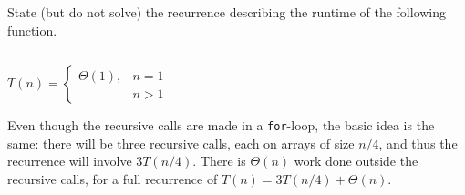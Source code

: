 \begin{prob}
    State (but do not solve) the recurrence describing the runtime of the following function.

    \inputminted{python}{code.py}

    $
        T(n) = \begin{cases}
            \Theta(1), & n = 1\\
             & n > 1
        \end{cases}
    $
    

    \begin{soln}
        Even though the recursive calls are made in a \texttt{for}-loop, the
        basic idea is the same: there will be three recursive calls, each on
        arrays of size $n/4$, and thus the recurrence will involve $3 T(n/4)$.
        There is $\Theta(n)$ work done outside the recursive calls, for a full
        recurrence of $T(n) = 3 T(n/4) + \Theta(n)$.
    \end{soln}

\end{prob}
